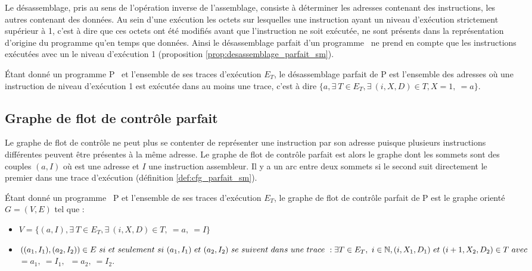Le désassemblage, pris au sens de l'opération inverse de l'assemblage,
consiste à déterminer les adresses contenant des instructions, les
autres contenant des données.
Au sein d'une exécution les octets sur lesquelles une instruction ayant
un niveau d'exécution strictement supérieur à 1, c'est à dire que ces
octets ont été modifiés avant que l'instruction ne soit exécutée, ne
sont présents dans la représentation d'origine du programme qu'en temps
que données.
Ainsi le désassemblage parfait d'un programme \sm\ ne prend en compte
que les instructions exécutées avec un le niveau d'exécution 1
(proposition \ref{prop:desassemblage_parfait_sm}).

\begin{prop}
 Étant donné un programme P \sm\ et l'ensemble de ses traces d'exécution
$E_T$, le désassemblage parfait de P est l'ensemble des adresses où une
instruction de niveau d'exécution 1 est exécutée dans au moins une
trace, c'est à dire
 $\{a, \exists\ T\in E_T, \exists\ (i, X, D)\in T, X=1,\ $$=a\}$.
\label{prop:desassemblage_parfait_sm}
\end{prop}


\subsection{Graphe de flot de contrôle parfait}
Le graphe de flot de contrôle ne peut plus se contenter de représenter
une instruction par son adresse puisque plusieurs instructions
différentes peuvent être présentes à la même adresse.
Le graphe de flot de contrôle parfait est alors le graphe dont les
sommets sont des couples $(a, I)$ où  est une adresse et $I$ une
instruction assembleur. Il y a un arc entre deux sommets si le second
suit directement le premier dans une trace d'exécution (définition
\ref{def:cfg_parfait_sm}).

\begin{defi}
 Étant donné un programme \sm\ P et l'ensemble de ses traces d'exécution
$E_T$, le graphe de flot de contrôle parfait de P est le graphe orienté
$G=(V, E)$ tel que :
 \begin{itemize}
  \item $V=\{(a, I),  \exists\ T\in E_T, \exists\ (i, X, D)\in T,\
$$=a,\ $$=I\}$
  \item $((a_1, I_1), (a_2, I_2))\in E\ si\ et\ seulement\ si\ (a_1,
I_1)\ et\ (a_2, I_2)\ se\ suivent\ dans\ une\ trace\ : \exists T\in
E_T,\ i\in \BN, (i, X_1, D_1)\ et\ (i+1, X_2, D_2)\in T\ avec\
$$=a_1,\ $$=I_1,$~$=a_2,\ $$=I_2$.
 \end{itemize}
\label{def:cfg_parfait_sm}
\end{defi}

